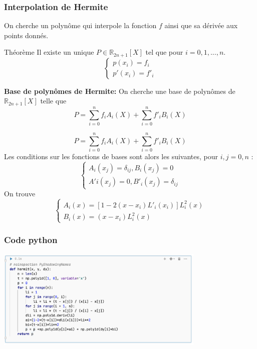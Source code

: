 \documentclass{beamer}
\begin{document}
\begin{frame}
 \frametitle{Interpolation de Hermite}
 On cherche un polynôme qui interpole la fonction $f$ ainsi que sa dérivée aux points
donnés.
\begin{block}{Théorème}
		Il existe un unique $P \in \mathbb{R}_{2n+1}[X]$ tel que  pour $i = 0, 1, ..., n$.
		 \[\left\{\begin{array}{l}
			 	p(x_i) = f_i \\
				p'(x_i) = f'_i
 				\end{array}\right.
 		\]
	\end{block}
\textbf{Base de polynômes de Hermite:}
On cherche une base de polynômes de $\mathbb{R}_{2n+1}[X]$ telle que
\[P=\sum_{i=0}^nf_i A_i(X)+\sum_{i=0}^nf'_i B_i(X)\]
\end{frame}

\begin{frame}
\[P=\sum_{i=0}^nf_i A_i(X)+\sum_{i=0}^nf'_i B_i(X)\]
Les conditions sur les fonctions de bases sont alors les suivantes, pour $i,j = 0, n$ : 
\[\left\{\begin{array}{l}
A_i(x_j) = \delta_{ij} , B_i(x_j) = 0 \\
A'i(x_j) = 0, B'_i(x_j) =\delta_{ij}  
\end{array}\right.
 		\]
 On trouve
 \[\left\{\begin{array}{l}
A_i(x) = \left[1-2(x-x_i)L'_i(x_i)\right]L^2_i(x) \\
B_i(x) = (x-x_i)L^2_i(x) 
\end{array}\right.
 \]

\end{frame}




\begin{frame}
 \frametitle{Code python}
\begin{center}
\includegraphics[width=10cm]{images/interpolationDHermit00.png}
\end{center}
\end{frame}
\end{document}
